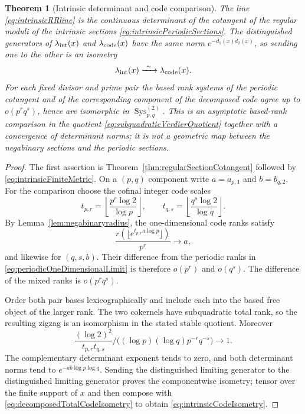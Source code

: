\documentclass[11pt]{amsart}
\newtheorem{theorem}{Theorem}[section]
\theoremstyle{definition}
\theoremstyle{remark}
\begin{document}
\begin{theorem}[Intrinsic determinant and code comparison]
\label{thm:intrinsicCodeComparison}
The line \eqref{eq:intrinsicRRline} is the continuous determinant of the
cotangent of the regular moduli of the intrinsic sections
\eqref{eq:intrinsicPeriodicSections}.  The distinguished generators of
$\lambda_{\rm int}(x)$ and $\lambda_{\rm code}(x)$ have the same norm
$e^{-d_1(x)d_2(x)}$, so sending one to the other is an isometry
\begin{equation}\label{eq:intrinsicCodeIsometry}
 \lambda_{\rm int}(x)\xrightarrow{\ \sim\ }\lambda_{\rm code}(x).
\end{equation}
For each fixed divisor and prime pair the based rank systems of the
periodic cotangent and of the corresponding component of the decomposed
code agree up to $o(p^rq^s)$, hence are isomorphic in
$\operatorname{Sys}_{p,q}^{(2)}$.  This is an asymptotic based-rank
comparison in the quotient \eqref{eq:subquadraticVerdierQuotient} together
with a convergence of determinant norms; it is not a geometric map between
the negabinary sections and the periodic sections.
\end{theorem}

\begin{proof}
The first assertion is Theorem~\ref{thm:regularSectionCotangent} followed by
\eqref{eq:intrinsicFiniteMetric}.  On a $(p,q)$ component write
$a=a_{p,1}$ and $b=b_{q,2}$.  For the comparison choose the cofinal integer
code scales
\[
 t_{p,r}=\left\lfloor\frac{p^r\log2}{\log p}\right\rfloor,
 \qquad
 t_{q,s}=\left\lfloor\frac{q^s\log2}{\log q}\right\rfloor.
\]
By Lemma~\ref{lem:negabinaryradius}, the one-dimensional code ranks satisfy
\[
 \frac{r(\lfloor e^{t_{p,r}a\log p}\rfloor)}{p^r}\longrightarrow a,
\]
and likewise for $(q,s,b)$.  Their difference from the periodic ranks in
\eqref{eq:periodicOneDimensionalLimit} is therefore $o(p^r)$ and $o(q^s)$.
The difference of the mixed ranks is $o(p^rq^s)$.

Order both pair bases lexicographically and include each into the based
free object of the larger rank.  The two cokernels have subquadratic total
rank, so the resulting zigzag is an isomorphism in the stated stable
quotient.  Moreover
\[
 \frac{(\log2)^2}{t_{p,r}t_{q,s}}
 \big/\bigl((\log p)(\log q)p^{-r}q^{-s}\bigr)
 \longrightarrow1.
\]
The complementary determinant exponent tends to zero, and both determinant
norms tend to $e^{-ab\log p\log q}$.  Sending the distinguished limiting
generator to the distinguished limiting generator proves
the componentwise isometry; tensor over the finite support of $x$ and then
compose with \eqref{eq:decomposedTotalCodeIsometry} to obtain
\eqref{eq:intrinsicCodeIsometry}.
\end{proof}
\end{document}
